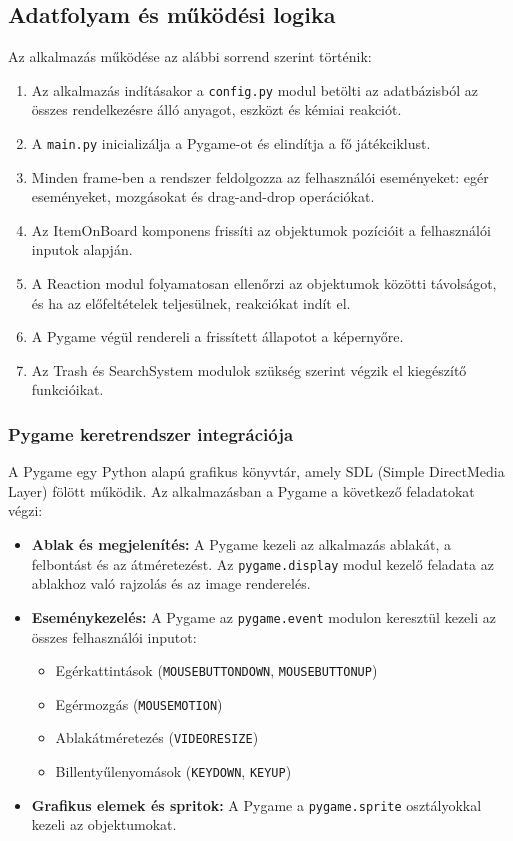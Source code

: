 \documentclass[]{thesis-ekf}
\begin{document}
	\subsection{Adatfolyam és működési logika}
	
	Az alkalmazás működése az alábbi sorrend szerint történik:
	
	\begin{enumerate}
		\item Az alkalmazás indításakor a \texttt{config.py} modul betölti az adatbázisból az összes rendelkezésre álló anyagot, eszközt és kémiai reakciót.
		\item A \texttt{main.py} inicializálja a Pygame-ot és elindítja a fő játékciklust.
		\item Minden frame-ben a rendszer feldolgozza az felhasználói eseményeket: egér eseményeket, mozgásokat és drag-and-drop operációkat.
		\item Az ItemOnBoard komponens frissíti az objektumok pozícióit a felhasználói inputok alapján.
		\item A Reaction modul folyamatosan ellenőrzi az objektumok közötti távolságot, és ha az előfeltételek teljesülnek, reakciókat indít el.
		\item A Pygame végül rendereli a frissített állapotot a képernyőre.
		\item Az Trash és SearchSystem modulok szükség szerint végzik el kiegészítő funkcióikat.
	\end{enumerate}
	
	
	\subsubsection{Pygame keretrendszer integrációja}
	
	A Pygame egy Python alapú grafikus könyvtár, amely SDL (Simple DirectMedia Layer) fölött működik. Az alkalmazásban a Pygame a következő feladatokat végzi:
	
	\begin{itemize}
		\item \textbf{Ablak és megjelenítés:} A Pygame kezeli az alkalmazás ablakát, a felbontást és az átméretezést. Az \texttt{pygame.display} modul kezelő feladata az ablakhoz való rajzolás és az image renderelés.
		
		\item \textbf{Eseménykezelés:} A Pygame az \texttt{pygame.event} modulon keresztül kezeli az összes felhasználói inputot:
		\begin{itemize}
			\item Egérkattintások (\texttt{MOUSEBUTTONDOWN}, \texttt{MOUSEBUTTONUP})
			\item Egérmozgás (\texttt{MOUSEMOTION})
			\item Ablakátméretezés (\texttt{VIDEORESIZE})
			\item Billentyűlenyomások (\texttt{KEYDOWN}, \texttt{KEYUP})
		\end{itemize}
		
		\item \textbf{Grafikus elemek és spritok:} A Pygame a \texttt{pygame.sprite} osztályokkal kezeli az objektumokat.
		
	\end{itemize}
	
\end{document}
